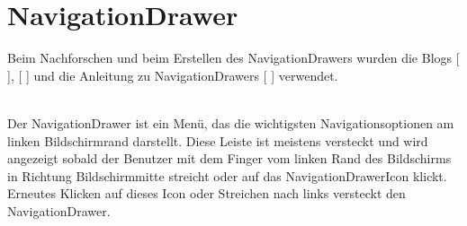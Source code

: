 \documentclass[FIPLY_base.tex]{subfiles}
\author{Andreas Denkmayr}
\date{12. März 2016}
\begin{document}
\section{NavigationDrawer}
Beim Nachforschen und beim Erstellen des NavigationDrawers wurden die Blogs [ \cite{bNavDrawer}], [ \cite{bNavDrawerRT}] und die Anleitung zu NavigationDrawers [ \cite{adNavDrawer}] verwendet. 

\ \\
Der NavigationDrawer ist ein Menü, das die wichtigsten Navigationsoptionen am linken Bildschirmrand darstellt.
Diese Leiste ist meistens versteckt und wird angezeigt sobald der Benutzer mit dem Finger vom linken Rand des Bildschirms in Richtung Bildschirmmitte streicht oder auf das NavigationDrawerIcon klickt.
Erneutes Klicken auf dieses Icon oder Streichen nach links versteckt den NavigationDrawer. \newline
\ \\
\end{document}

